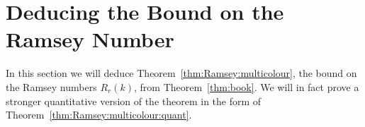 
\section{Deducing the Bound on the Ramsey Number}

In this section we will deduce Theorem~\ref{thm:Ramsey:multicolour}, the bound on the Ramsey numbers \(R_r(k)\), from Theorem~\ref{thm:book}.
We will in fact prove a stronger quantitative version of the theorem in the form of Theorem~\ref{thm:Ramsey:multicolour:quant}.


